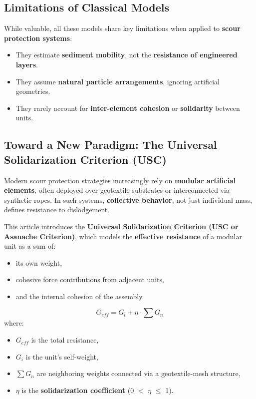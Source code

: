 \documentclass[Journal,letterpaper]{ascelike-new}
\begin{document}
\subsection{Limitations of Classical Models}

While valuable, all these models share key limitations when applied to \textbf{scour protection systems}:

\begin{itemize}
\item  They estimate \textbf{sediment mobility}, not the \textbf{resistance of engineered layers}.

\item  They assume \textbf{natural particle arrangements}, ignoring artificial geometries.

\item  They rarely account for \textbf{inter-element cohesion} or \textbf{solidarity} between units.
\end{itemize}


\subsection{Toward a New Paradigm: The Universal Solidarization Criterion (USC)}

Modern scour protection strategies increasingly rely on \textbf{modular artificial elements}, often deployed over geotextile substrates or interconnected via synthetic ropes. In such systems, \textbf{collective behavior}, not just individual mass, defines resistance to dislodgement.

This article introduces the \textbf{Universal Solidarization Criterion (USC or Asanache Criterion)}, which models the \textbf{effective resistance} of a modular unit as a sum of:

\begin{itemize}
\item  its own weight,

\item  cohesive force contributions from adjacent units,

\item  and the internal cohesion of the assembly.

\end{itemize}

\[G_{eff}=G_i+\eta \cdot \sum{G_n}\]
where:

\begin{itemize}
\item  $G_{eff}$ is the total resistance,

\item  $G_i$ is the unit's self-weight,

\item  $\sum{G_n}$ are neighboring weights connected via a geotextile-mesh structure,

\item  $\eta $ is the \textbf{solidarization coefficient} (0 $\mathrm{<}$ $\eta $ $\mathrm{\le}$ 1).
\end{itemize}
\end{document}
